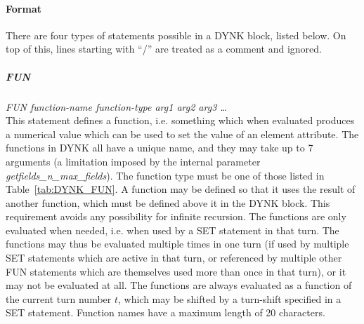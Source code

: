 \paragraph{Format}
There are four types of statements possible in a DYNK block, listed below.
On top of this, lines starting with ``/'' are treated as a comment and ignored.

\subparagraph{FUN} \emph{FUN function-name function-type arg1 arg2 arg3 \ldots}\\
This statement defines a function, i.e. something which when evaluated produces a numerical value which can be used to set the value of an element attribute.
The functions in DYNK all have a unique name, and they may take up to 7 arguments (a limitation imposed by the internal parameter \emph{getfields\_n\_max\_fields}).
The function type must be one of those listed in Table~\ref{tab:DYNK_FUN}.
A function may be defined so that it uses the result of another function, which must be defined above it in the DYNK block.
This requirement avoids any possibility for infinite recursion.
The functions are only evaluated when needed, i.e. when used by a SET statement in that turn.
The functions may thus be evaluated multiple times in one turn (if used by multiple SET statements which are active in that turn, or referenced by multiple other FUN statements which are themselves used more than once in that turn), or it may not be evaluated at all.
The functions are always evaluated as a function of the current turn number $t$, which may be shifted by a turn-shift specified in a SET statement.
Function names have a maximum length of 20 characters.

